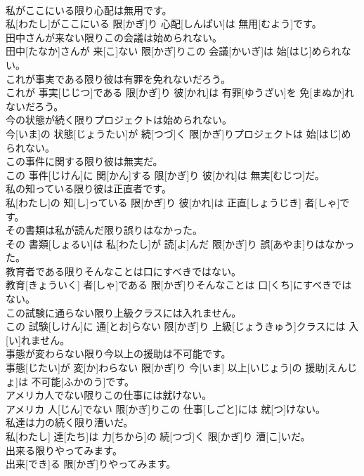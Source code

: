 \documentclass[8pt]{extreport}
\begin{document}
\begin{CJK}{UTF8}{min}
\\	私がここにいる限り心配は無用です。	
\\	私[わたし]がここにいる 限[かぎ]り 心配[しんぱい]は 無用[むよう]です。
\\	田中さんが来ない限りこの会議は始められない。	
\\	田中[たなか]さんが 来[こ]ない 限[かぎ]りこの 会議[かいぎ]は 始[はじ]められない。
\\	これが事実である限り彼は有罪を免れないだろう。	
\\	これが 事実[じじつ]である 限[かぎ]り 彼[かれ]は 有罪[ゆうざい]を 免[まぬか]れないだろう。
\\	今の状態が続く限りプロジェクトは始められない。	
\\	今[いま]の 状態[じょうたい]が 続[つづ]く 限[かぎ]りプロジェクトは 始[はじ]められない。
\\	この事件に関する限り彼は無実だ。	
\\	この 事件[じけん]に 関[かん]する 限[かぎ]り 彼[かれ]は 無実[むじつ]だ。
\\	私の知っている限り彼は正直者です。	
\\	私[わたし]の 知[し]っている 限[かぎ]り 彼[かれ]は 正直[しょうじき] 者[しゃ]です。
\\	その書類は私が読んだ限り誤りはなかった。	
\\	その 書類[しょるい]は 私[わたし]が 読[よ]んだ 限[かぎ]り 誤[あやま]りはなかった。
\\	教育者である限りそんなことは口にすべきではない。	
\\	教育[きょういく] 者[しゃ]である 限[かぎ]りそんなことは 口[くち]にすべきではない。
\\	この試験に通らない限り上級クラスには入れません。	
\\	この 試験[しけん]に 通[とお]らない 限[かぎ]り 上級[じょうきゅう]クラスには 入[い]れません。
\\	事態が変わらない限り今以上の援助は不可能です。	
\\	事態[じたい]が 変[か]わらない 限[かぎ]り 今[いま] 以上[いじょう]の 援助[えんじょ]は 不可能[ふかのう]です。
\\	アメリカ人でない限りこの仕事には就けない。	
\\	アメリカ 人[じん]でない 限[かぎ]りこの 仕事[しごと]には 就[つ]けない。
\\	私達は力の続く限り漕いだ。	
\\	私[わたし] 達[たち]は 力[ちから]の 続[つづ]く 限[かぎ]り 漕[こ]いだ。
\\	出来る限りやってみます。	
\\	出来[でき]る 限[かぎ]りやってみます。

\end{CJK}
\end{document}
